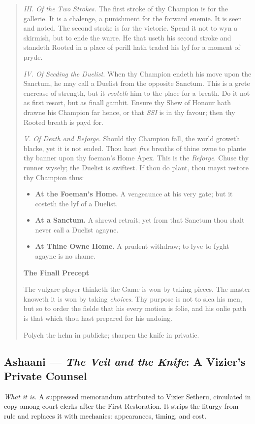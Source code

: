 \documentclass[11pt]{article}
\begin{document}
\begin{quote}
\textit{III. Of the Two Strokes.}
The first stroke of thy Champion is for the gallerie. It is a chalenge, a punishment for the forward enemie. It is seen and noted. The second stroke is for the victorie. Spend it not to wyn a skirmish, but to ende the warre. He that useth his second stroke and standeth Rooted in a place of perill hath traded his lyf for a moment of pryde.

\textit{IV. Of Seeding the Duelist.}
When thy Champion endeth his move upon the Sanctum, he may call a Duelist from the opposite Sanctum. This is a grete encrease of strength, but it \emph{rooteth} him to the place for a breath. Do it not as first resort, but as finall gambit. Ensure thy Shew of Honour hath drawne his Champion far hence, or that \emph{SSI} is in thy favour; then thy Rooted breath is payd for.

\textit{V. Of Death and Reforge.}
Should thy Champion fall, the world groweth blacke, yet it is not ended. Thou hast \emph{five} breaths of thine owne to plante thy banner upon thy foeman’s Home Apex. This is the \emph{Reforge}. Chuse thy runner wysely; the Duelist is swiftest. If thou do plant, thou mayst restore thy Champion thus:
\begin{itemize}\itemsep0.2em
  \item \textbf{At the Foeman’s Home.} A vengeaunce at his very gate; but it costeth the lyf of a Duelist.
  \item \textbf{At a Sanctum.} A shrewd retrait; yet from that Sanctum thou shalt never call a Duelist agayne.
  \item \textbf{At Thine Owne Home.} A prudent withdraw; to lyve to fyght agayne is no shame.
\end{itemize}

\medskip
\textbf{The Finall Precept}

The vulgare player thinketh the Game is won by taking pieces. The master knoweth it is won by taking \emph{choices}. Thy purpose is not to slea his men, but so to order the fielde that his every motion is folie, and his onlie path is that which thou hast prepared for his undoing.

Polych the helm in publicke; sharpen the knife in privatie.

\end{quote}

\clearpage

\subsection{Ashaani — \textit{The Veil and the Knife}: A Vizier’s Private Counsel}
\textit{What it is.} A suppressed memorandum attributed to Vizier Setheru, circulated in copy among court clerks after the First Restoration. It strips the liturgy from rule and replaces it with mechanics: appearances, timing, and cost.
\end{document}
